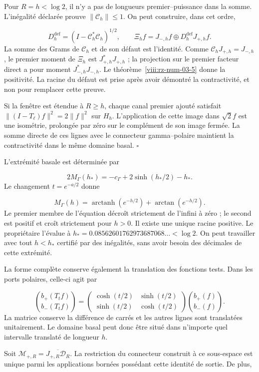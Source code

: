 Pour \(R=h<\log2\), il n’y a pas de longueurs premier–puissance dans la somme. L’inégalité déclarée prouve \(\|\mathcal C_h\|\leq1\). On peut construire, dans cet ordre,

\[
D_h^{\mathrm{def}}=(I-\mathcal C_h^*\mathcal C_h)^{1/2},
\qquad
\Xi_hf=J_{-,h}f\oplus D_h^{\mathrm{def}}J_{+,h}f.
\]
La somme des Grams de \(\mathcal C_h\) et de son défaut est l’identité. Comme \(\mathcal C_hJ_{+,h}=J_{-,h}\), le premier moment de \(\Xi_h\) est \(J_{+,h}^*J_{+,h}\) ; la projection sur le premier facteur direct a pour moment \(J_{-,h}^*J_{-,h}\). Le théorème~\ref{viii:rz-num-03-5} donne la positivité. La racine du défaut est prise après avoir démontré la contractivité, et non pour remplacer cette preuve.

Si la fenêtre est étendue à \(R\geq h\), chaque canal premier ajouté satisfait \(\|(I-T_\ell)f\|^2=2\|f\|^2\) sur \(H_h\). L'application de cette image dans \(\sqrt2f\) est une isométrie, prolongée par zéro sur le complément de son image fermée. La somme directe de ces lignes avec le connecteur gamma–polaire maintient la contractivité dans le même domaine basal. \hfill\(\square\)

L’extrémité basale est déterminée par

\[
2M_\Gamma(h_*)=-c_\Gamma+2\sinh(h_*/2)-h_*.
\]
Le changement \(t=e^{-a/2}\) donne

\[
M_\Gamma(h)=\operatorname{arctanh}(e^{-h/2})
+\arctan(e^{-h/2}).
\]
Le premier membre de l’équation décroît strictement de l’infini à zéro ; le second est positif et croît strictement pour \(h>0\). Il existe une unique racine positive. Le propriétaire l’évalue à \(h_*=0.08562601762973687068\ldots<\log2\). On peut travailler avec tout \(h<h_*\) certifié par des inégalités, sans avoir besoin des décimales de cette extrémité.

La forme complète conserve également la translation des fonctions tests. Dans les ports polaires, celle-ci agit par

\[
\binom{b_+(T_tf)}{b_-(T_tf)}=
\begin{pmatrix}\cosh(t/2)&\sinh(t/2)\\
\sinh(t/2)&\cosh(t/2)\end{pmatrix}
\binom{b_+(f)}{b_-(f)}.
\]
La matrice conserve la différence de carrés et les autres lignes sont translatées unitairement. Le domaine basal peut donc être situé dans n'importe quel intervalle translaté de longueur \(h\).

Soit \(\mathcal M_{+,R}=\overline{J_{+,R}\mathcal D_R}\). La restriction du connecteur construit à ce sous-espace est unique parmi les applications bornées possédant cette identité de sortie. De plus,

